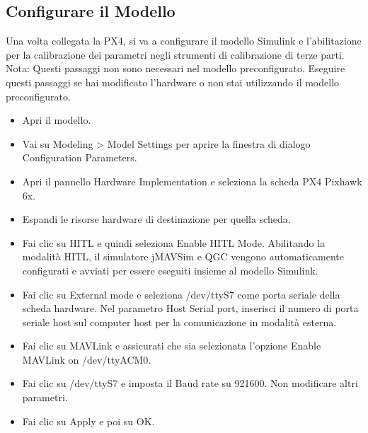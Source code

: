 \subsection{Configurare il Modello}
 Una volta collegata la PX4, si va a configurare il modello Simulink e l'abilitazione per la calibrazione dei parametri negli strumenti di calibrazione di terze parti.
\\
Nota: Questi passaggi non sono necessari nel modello preconfigurato. Eseguire questi passaggi se hai modificato l'hardware o non stai utilizzando il modello preconfigurato.
\\
\begin{itemize}
    \item Apri il modello.
    \item Vai su Modeling > Model Settings per aprire la finestra di dialogo Configuration Parameters.
    \item Apri il pannello Hardware Implementation e seleziona la scheda PX4 Pixhawk 6x.
    \item Espandi le risorse hardware di destinazione per quella scheda.
    \item Fai clic su HITL e quindi seleziona Enable HITL Mode. Abilitando la modalità HITL, il simulatore jMAVSim e QGC vengono automaticamente configurati e avviati per essere eseguiti insieme al modello Simulink.
    \item Fai clic su External mode e seleziona /dev/ttyS7 come porta seriale della scheda hardware. Nel parametro Host Serial port, inserisci il numero di porta seriale host sul computer host per la comunicazione in modalità esterna.
    \item Fai clic su MAVLink e assicurati che sia selezionata l'opzione Enable MAVLink on /dev/ttyACM0.
    \item Fai clic su /dev/ttyS7 e imposta il Baud rate su 921600. Non modificare altri parametri.
    \item Fai clic su Apply e poi su OK.
\end{itemize}

